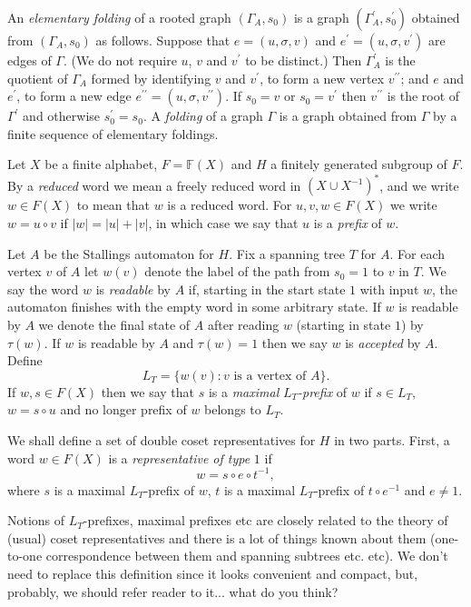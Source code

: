 \documentclass[a4paper,12pt]{article}
\newcommand{\G}{\Gamma }
\newcommand{\s}{\sigma }
\renewcommand{\t}{\tau }
\numberwithin{equation}{section}
\numberwithin{figure}{section}
\newcommand{\FF}{\ensuremath{\mathbb{F}}}
\begin{document}
An {\em elementary folding} of a rooted graph $(\G_A,s_0)$ is a
graph $(\G^\prime_A,s^\prime_0)$ obtained from $(\G_A,s_0)$ as
follows. Suppose that $e=(u, \s, v)$ and $e^\prime=(u, \s,
v^\prime)$ are edges of $\G$. (We do not require $u$, $v$ and
$v^\prime$ to be distinct.)
 Then $\G^\prime_A$ is the quotient of $\G_A$ formed by identifying
$v$ and $v^\prime$, to form a new vertex $v^{\prime\prime}$; and
$e$ and $e^\prime$, to form a new edge $e^{\prime\prime}=(u, \s,
v^{\prime\prime})$. If $s_0= v$ or $s_0 = v^\prime$ then
$v^{\prime\prime}$ is the root of $\G^\prime$ and otherwise
$s^\prime_0=s_0$.
 A {\em folding} of a graph $\G$ is a graph obtained
from $\G$ by a finite sequence of elementary foldings.


Let $X$ be a finite alphabet, $F=\FF(X)$ and $H$ a finitely generated subgroup
of $F$.  By a {\em reduced} word we mean
 a freely reduced word in $(X\cup X^{-1})^\ast$, and we write $w\in F(X)$
to mean that $w$ is a reduced word. For $u,v, w\in F(X)$ we
write $w=u\circ v$ if $|w|=|u|+|v|$, in which case we say that $u$ is a {\em prefix}
of $w$.

Let $A$ be the Stallings automaton for $H$. Fix a spanning tree
$T$ for $A$. For each vertex $v$ of $A$ let $w(v)$ denote the
label of the path from $s_0=1$ to $v$ in $T$. We say the word $w$
is {\em readable} by $A$ if, starting in the start state $1$ with
input $w$, the automaton finishes with the empty word in some
arbitrary state. If $w$ is readable by $A$ we denote the final
state of $A$ after reading $w$ (starting in state $1$) by $\t(w)$.
If $w$ is readable by $A$ and $\t(w)=1$
 then we say $w$ is {\em accepted} by $A$. Define
\[L_T=\{w(v): v \textrm{ is a vertex of } A\}.\]
If $w, s\in F(X)$ then we say that $s$ is a {\em maximal}
$L_T${\em -prefix} of $w$ if $s\in L_T$, $w=s\circ u$ and no
longer prefix of $w$ belongs to $L_T$.

We shall define a set of double coset representatives for $H$ in two parts.
First, a word $w\in F(X)$ is a {\em representative of type} $1$ if
\[w=s\circ e \circ t^{-1},\]
where $s$ is a maximal $L_T$-prefix of $w$, $t$ is a maximal
$L_T$-prefix of $t\circ e^{-1}$ and $e\neq 1$.

{\ef Notions of $L_T$-prefixes, maximal prefixes etc are closely related to the theory of (usual) coset
 representatives and there is a lot of things known about them (one-to-one correspondence between them and spanning subtrees etc. etc).
 We don't need to replace this definition since it looks convenient and compact, but, probably, we should refer reader to it... what do you think?
}
\end{document}
